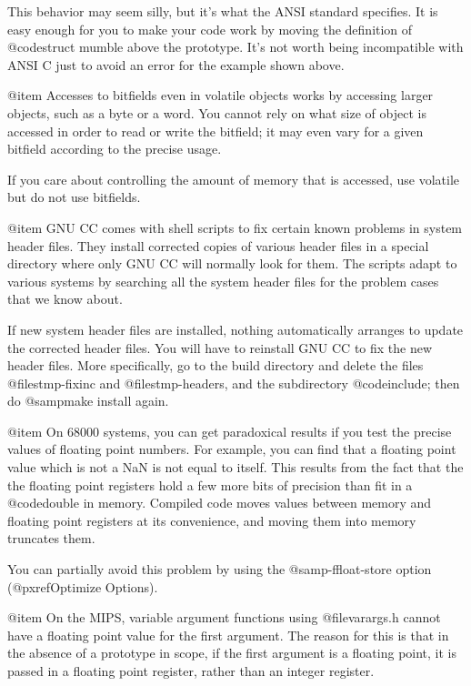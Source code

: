 This behavior may seem silly, but it's what the ANSI standard specifies.
It is easy enough for you to make your code work by moving the
definition of @code{struct mumble} above the prototype.  It's not worth
being incompatible with ANSI C just to avoid an error for the example
shown above.

@item
Accesses to bitfields even in volatile objects works by accessing larger
objects, such as a byte or a word.  You cannot rely on what size of
object is accessed in order to read or write the bitfield; it may even
vary for a given bitfield according to the precise usage.

If you care about controlling the amount of memory that is accessed, use
volatile but do not use bitfields.

@item
GNU CC comes with shell scripts to fix certain known problems in system
header files.  They install corrected copies of various header files in
a special directory where only GNU CC will normally look for them.  The
scripts adapt to various systems by searching all the system header
files for the problem cases that we know about.

If new system header files are installed, nothing automatically arranges
to update the corrected header files.  You will have to reinstall GNU CC
to fix the new header files.  More specifically, go to the build
directory and delete the files @file{stmp-fixinc} and
@file{stmp-headers}, and the subdirectory @code{include}; then do
@samp{make install} again.

@item
On 68000 systems, you can get paradoxical results if you test the
precise values of floating point numbers.  For example, you can find
that a floating point value which is not a NaN is not equal to itself.
This results from the fact that the the floating point registers hold a
few more bits of precision than fit in a @code{double} in memory.
Compiled code moves values between memory and floating point registers
at its convenience, and moving them into memory truncates them.

You can partially avoid this problem by using the @samp{-ffloat-store}
option (@pxref{Optimize Options}).

@item
On the MIPS, variable argument functions using @file{varargs.h}
cannot have a floating point value for the first argument.  The
reason for this is that in the absence of a prototype in scope,
if the first argument is a floating point, it is passed in a
floating point register, rather than an integer register.

